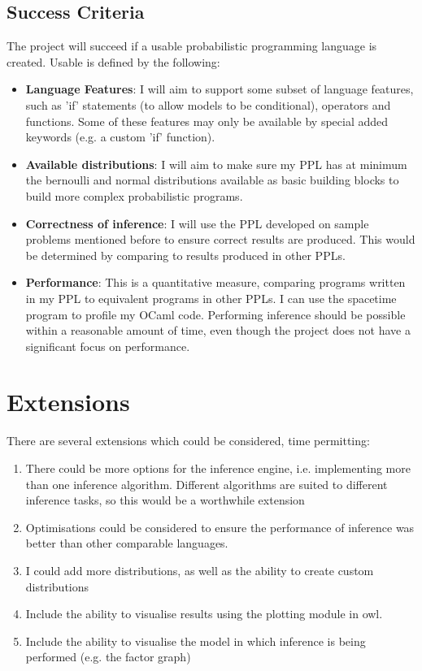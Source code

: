 \subsection*{Success Criteria}

The project will succeed if a usable probabilistic programming language is created. Usable is defined by the following:

\begin{itemize}
      \item \textbf{Language Features}: I will aim to support some subset of language features, such as 'if' statements (to allow models to be conditional), operators and functions. Some of these features may only be available by special added keywords (e.g. a custom 'if' function).
      \item \textbf{Available distributions}: I will aim to make sure my PPL has at minimum the bernoulli and normal distributions available as basic building blocks to build more complex probabilistic programs.
      \item \textbf{Correctness of inference}: I will use the PPL developed on sample problems mentioned before to ensure correct results are produced. This would be determined by comparing to results produced in other PPLs. 
      \item \textbf{Performance}: This is a quantitative measure, comparing programs written in my PPL to equivalent programs in other PPLs. I can use the spacetime program to profile my OCaml code. Performing inference should be possible within a reasonable amount of time, even though the project does not have a significant focus on performance.
\end{itemize}

\section*{Extensions}

There are several extensions which could be considered, time permitting:

\begin{enumerate}
      \item There could be more options for the inference engine, i.e. implementing more than one inference algorithm. Different algorithms are suited to different inference tasks, so this would be a worthwhile extension
      \item Optimisations could be considered to ensure the performance of inference was better than other comparable languages.
      \item I could add more distributions, as well as the ability to create custom distributions
      \item Include the ability to visualise results using the plotting module in owl.
      \item Include the ability to visualise the model in which inference is being performed (e.g. the factor graph)
\end{enumerate}


